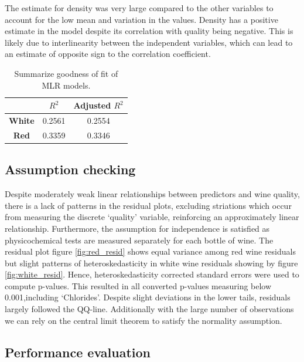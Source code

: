 \documentclass[letterpaper,11pt,twocolumn,twoside,]{pinp}
\begin{document}
The estimate for density was very large compared to the other variables
to account for the low mean and variation in the values. Density has a
positive estimate in the model despite its correlation with quality
being negative. This is likely due to interlinearity between the
independent variables, which can lead to an estimate of opposite sign to
the correlation coefficient.

\begin{table}[ht]
\begin{tabular}{ ccc } 
\hline
\textbf{} & \textbf{$R^2$} & \textbf{Adjusted $R^2$} \\
\hline
\textbf{White} & 0.2561 & 0.2554 \\
\textbf{Red} & 0.3359 & 0.3346 \\
\hline
\end{tabular}
\centering
\caption{Summarize goodness of fit of MLR models.}
\label{table:performance_mlr}
\end{table}

\vspace{-8truemm}

\hypertarget{assumption-checking}{%
\subsection{Assumption checking}\label{assumption-checking}}

Despite moderately weak linear relationships between predictors and wine
quality, there is a lack of patterns in the residual plots, excluding
striations which occur from measuring the discrete `quality' variable,
reinforcing an approximately linear relationship. Furthermore, the
assumption for independence is satisfied as physicochemical tests are
measured separately for each bottle of wine. The residual plot figure
\ref{fig:red_resid} shows equal variance among red wine residuals but
slight patterns of heteroskedasticity in white wine residuals showing by
figure \ref{fig:white_resid}. Hence, heteroskedasticity corrected
standard errors were used to compute p-values. This resulted in all
converted p-values measuring below 0.001,including `Chlorides'. Despite
slight deviations in the lower tails, residuals largely followed the
QQ-line. Additionally with the large number of observations we can rely
on the central limit theorem to satisfy the normality assumption.

\hypertarget{performance-evaluation}{%
\subsection{Performance evaluation}\label{performance-evaluation}}
\end{document}
